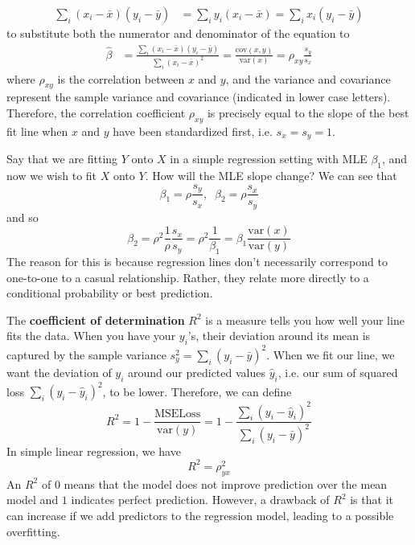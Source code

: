 \documentclass{article}
\begin{document}
    \begin{align*}
      \sum_{i} (x_i - \bar{x}) (y_i - \bar{y}) & = \sum_i y_i (x_i - \bar{x}) = \sum_i x_i (y_i - \bar{y}) 
    \end{align*}
    to substitute both the numerator and denominator of the equation to 
    \begin{align*}
      \hat{\beta} & = \frac{\sum_i (x_i - \bar{x}) (y_i - \bar{y})}{\sum_i (x_i - \bar{x})^2} = \frac{\mathrm{cov}(x, y)}{\mathrm{var}(x)} = \rho_{xy} \frac{s_y}{s_x}
    \end{align*}
    where $\rho_{xy}$ is the correlation between $x$ and $y$, and the variance and covariance represent the sample variance and covariance (indicated in lower case letters). Therefore, the correlation coefficient $\rho_{xy}$ is precisely equal to the slope of the best fit line when $x$ and $y$ have been standardized first, i.e. $s_x = s_y = 1$. 

    \begin{example}
      Say that we are fitting $Y$ onto $X$ in a simple regression setting with MLE $\beta_1$, and now we wish to fit $X$ onto $Y$. How will the MLE slope change? We can see that 
      \[\beta_1 = \rho \frac{s_y}{s_x} , \;\; \beta_2 = \rho \frac{s_x}{s_y}\]
      and so 
      \[\beta_2 = \rho^2 \frac{1}{\rho} \frac{s_x}{s_y} = \rho^2 \frac{1}{\beta_1} = \beta_1 \frac{\mathrm{var}(x)}{\mathrm{var}(y)}\]
      The reason for this is because regression lines don't necessarily correspond to one-to-one to a casual relationship. Rather, they relate more directly to a conditional probability or best prediction. 
    \end{example}

    The \textbf{coefficient of determination} $R^2$ is a measure tells you how well your line fits the data. When you have your $y_i$'s, their deviation around its mean is captured by the sample variance $s^2_y = \sum_i (y_i - \bar{y})^2$. When we fit our line, we want the deviation of $y_i$ around our predicted values $\hat{y}_i$, i.e. our sum of squared loss $\sum_i (y_i - \hat{y}_i)^2$, to be lower. Therefore, we can define 
    \[R^2 = 1 - \frac{\mathrm{MSE Loss}}{\mathrm{var}(y)} = 1 - \frac{\sum_i (y_i - \hat{y}_i)^2}{\sum_i (y_i - \bar{y})^2}\]
    In simple linear regression, we have 
    \[R^2 = \rho_{yx}^2\]
    An $R^2$ of $0$ means that the model does not improve prediction over the mean model and $1$ indicates perfect prediction. However, a drawback of $R^2$ is that it can increase if we add predictors to the regression model, leading to a possible overfitting. 
\end{document}
